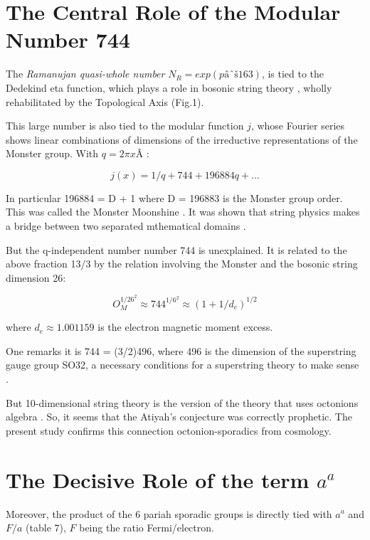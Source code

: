 \documentclass[a4paper,9pt]{article}
\begin{document}
\section{The Central Role of the Modular Number 744}

The \textit{Ramanujan quasi-whole number} $N_R = exp(pâˆš163)$, is tied to the Dedekind eta function, which plays a role in bosonic string theory \cite{Apostol}\cite{Lovelace}, wholly rehabilitated by the Topological Axis (Fig.1).

This large number is also tied to the modular function $j$, whose Fourier series shows linear combinations of dimensions of the irreductive representations of the Monster group. With $q = 2\pi x$Â :

\begin{equation}
j(x) = 1/q + 744 + 196884 q + ...
\end{equation}

In particular 196884 = D + 1 where D = 196883 is the Monster group order. This was called the Monster Moonshine \cite{Conway}. It was shown that string physics makes a bridge between two separated mthematical domains \cite{Borcherds}. 


But the q-independent number number 744 is unexplained. It is related to the above fraction 13/3 by the relation involving the Monster and the bosonic string dimension 26:

\begin{equation}
  O_M^{1/26^2} \approx 744^{1/6^2}\approx (1+1/d_e)^{1/2}   
\end{equation}

where $d_e \approx 1.001159$ is the electron magnetic moment excess.

One  remarks it is 744 = (3/2)496, where 496 is the dimension of the superstring gauge group SO32, a necessary conditions for a superstring theory to make sense \cite{Green}.


But 10-dimensional string theory is the version of the theory that uses octonions algebra \cite{Schlay}. So, it seems that the Atiyah's conjecture was correctly prophetic. The present study confirms this connection octonion-sporadics from cosmology.

\section{The Decisive Role of the term $a^a$ }

Moreover, the product of the 6 pariah sporadic groups is directly tied with $a^a$ and $F/a$ (table 7), $F$ being the ratio Fermi/electron. 
\end{document}
